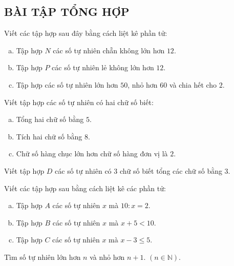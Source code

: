 \begin{bt}
\subsection{BÀI TẬP TỔNG HỢP}
\end{bt}  \begin{bt} 
Viết các tập hợp sau đây bằng cách liệt kê phần tử:
\begin{enumerate}[a)]
\item Tập hợp $N$ các số tự nhiên chẵn không lớn hơn $12$.
\item Tập hợp $P$ các số tự nhiên lẻ không lớn hơn $12$.
\item Tập hợp các số tự nhiên lớn hơn $50$, nhỏ hơn $60$ và chia hết cho $2$.
\end{enumerate}
\end{bt}  \begin{bt}
Viết tập hợp các số tự nhiên có hai chữ số biết:
\begin{enumerate}[a)]
\item Tổng hai chữ số bằng $5$.
\item Tích hai chữ số bằng $8$.
\item Chữ số hàng chục lớn hơn chữ số hàng đơn vị là $2$.
\end{enumerate}
\end{bt}  \begin{bt}
Viết tập hợp $D$ các số tự nhiên có $3$ chữ số biết tổng các chữ số bằng $3$.
\end{bt}  \begin{bt}
Viết các tập  hợp sau bằng cách liệt kê các phần tử:
\begin{enumerate}[a)]
\item Tập hợp $A$ các số tự nhiên $x$ mà $10 : x = 2$.
\item Tập hợp $B$ các số tự nhiên $x$ mà $x  + 5 < 10$.
\item Tập hợp $C$ các số tự nhiên $x$ mà $x - 3  \leq 5$.
\end{enumerate}   
\end{bt}  \begin{bt} 
Tìm số tự nhiên lớn hơn $n$ và nhỏ hơn $n + 1$. $\left( {n \in \mathbb{N}} \right)$.
\end{bt}